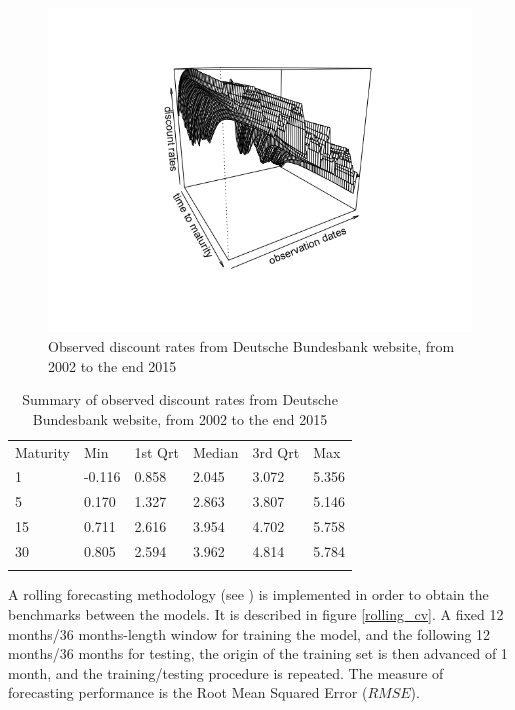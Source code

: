 \begin{figure}[!htb]
\centering
\includegraphics[width=14cm]{gfx/chapter-krls-models/bundesbank_dR.png}
\caption{Observed discount rates from Deutsche Bundesbank website, from 2002 to the end 2015}
\label{db_zerorates}
\end{figure}

\begin{table}[!htb]
\begin{center}
\caption{Summary of observed discount rates from Deutsche Bundesbank website, from 2002 to the end 2015}
\label{tab:summary_db_zeros}       %
\begin{tabular}{llllll}
\hline\noalign{\smallskip}
Maturity & Min & 1st Qrt  & Median  & 3rd Qrt  & Max  \\
\noalign{\smallskip}\hline\noalign{\smallskip}
  1 & -0.116 & 0.858 & 2.045 & 3.072 & 5.356 \\
  5 & 0.170 & 1.327 & 2.863 & 3.807 & 5.146\\
  15 & 0.711 & 2.616 & 3.954 & 4.702 & 5.758\\
  30 & 0.805 & 2.594 & 3.962 & 4.814 & 5.784\\
\noalign{\smallskip}\hline
\end{tabular}
\end{center}
\end{table}

A rolling forecasting methodology (see \cite{bergmeir2015note}) is implemented in order to obtain the benchmarks between the models. It is described in figure \ref{rolling_cv}. A fixed 12 months/36 months-length window for training the model, and the following 12 months/36 months for testing, the origin of the training set is then advanced of 1 month, and the training/testing procedure is repeated. The measure of forecasting performance is the Root Mean Squared Error ($RMSE$).

